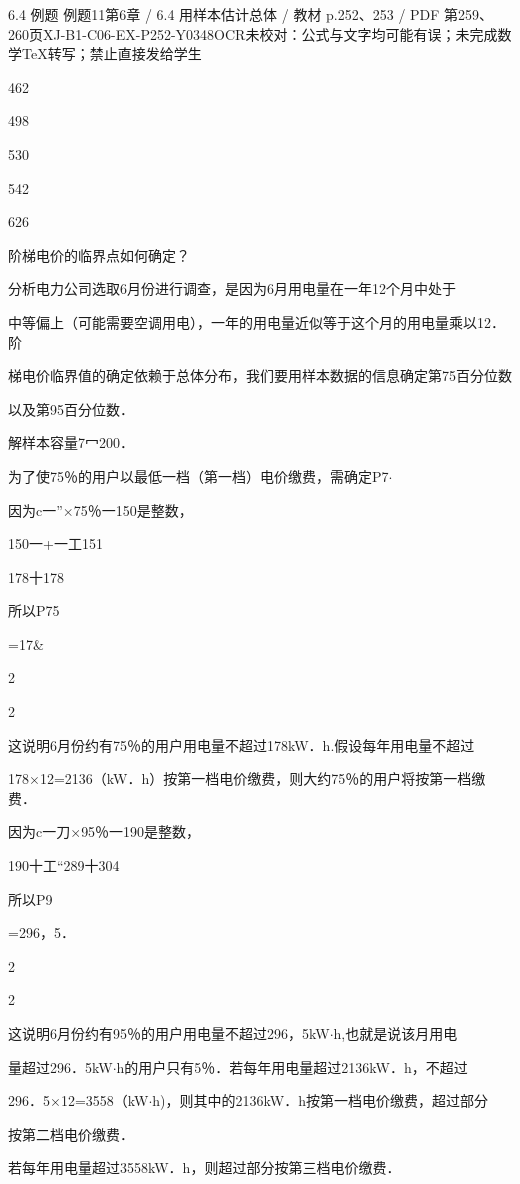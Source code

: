 \begin{bankitem}{6.4 例题 例题11}{第6章 / 6.4 用样本估计总体 / 教材 p.252、253 / PDF 第259、260页}{XJ-B1-C06-EX-P252-Y0348}{OCR未校对：公式与文字均可能有误；未完成数学TeX转写；禁止直接发给学生}
\begin{ocrdraft}
462
\par
498
\par
530
\par
542
\par
626
\par
阶梯电价的临界点如何确定？
\par
分析电力公司选取6月份进行调查，是因为6月用电量在一年12个月中处于
\par
中等偏上（可能需要空调用电），一年的用电量近似等于这个月的用电量乘以12．阶
\par
梯电价临界值的确定依赖于总体分布，我们要用样本数据的信息确定第75百分位数
\par
以及第95百分位数．
\par
解样本容量7冖200．
\par
为了使75％的用户以最低一档（第一档）电价缴费，需确定P7\ensuremath{\cdot}
\par
因为c一”\ensuremath{\times}75％一150是整数，
\par
150一+一工151
\par
178十178
\par
所以P75
\par
=17\&
\par
2
\par
2
\par
[教材p.253 / PDF第260页]
\par
这说明6月份约有75％的用户用电量不超过178kW．h.假设每年用电量不超过
\par
178\ensuremath{\times}12=2136（kW．h）按第一档电价缴费，则大约75％的用户将按第一档缴费．
\par
因为c一刀\ensuremath{\times}95％一190是整数，
\par
190十工“289十304
\par
所以P9
\par
=296，5．
\par
2
\par
2
\par
这说明6月份约有95％的用户用电量不超过296，5kW\ensuremath{\cdot}h,也就是说该月用电
\par
量超过296．5kW\ensuremath{\cdot}h的用户只有5％．若每年用电量超过2136kW．h，不超过
\par
296．5\ensuremath{\times}12=3558（kW\ensuremath{\cdot}h)，则其中的2136kW．h按第一档电价缴费，超过部分
\par
按第二档电价缴费．
\par
若每年用电量超过3558kW．h，则超过部分按第三档电价缴费．
\end{ocrdraft}
\end{bankitem}
